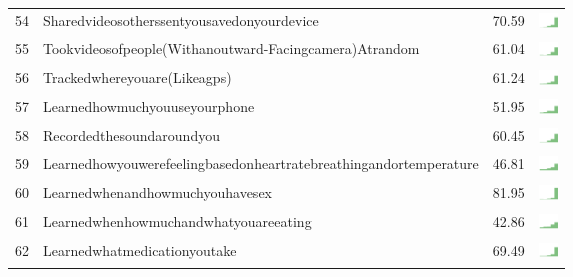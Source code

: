 \begin{table}[t]
\begin{center}
\begin{tabular}{| p{0.5cm} | p{7cm} | p{1cm} | c |}
54 & Sharedvideosotherssentyousavedonyourdevice & 70.59 & \includegraphics[width = 0.5cm, height = 0.5cm]{../sharedvideosotherssentyousavedonyourdevicecombined} \\ 
55 & Tookvideosofpeople(Withanoutward-Facingcamera)Atrandom & 61.04 & \includegraphics[width = 0.5cm, height = 0.5cm]{../tookvideosofpeople(withanoutward-facingcamera)atrandomcombined} \\ 
56 & Trackedwhereyouare(Likeagps) & 61.24 & \includegraphics[width = 0.5cm, height = 0.5cm]{../trackedwhereyouare(likeaGPS)combined} \\ 
57 & Learnedhowmuchyouuseyourphone & 51.95 & \includegraphics[width = 0.5cm, height = 0.5cm]{../learnedhowmuchyouuseyourphonecombined} \\ 
58 & Recordedthesoundaroundyou & 60.45 & \includegraphics[width = 0.5cm, height = 0.5cm]{../recordedthesoundaroundyoucombined} \\ 
59 & Learnedhowyouwerefeelingbasedonheartratebreathingandortemperature & 46.81 & \includegraphics[width = 0.5cm, height = 0.5cm]{../learnedhowyouwerefeelingbasedonheartratebreathingandortemperaturecombined} \\ 
60 & Learnedwhenandhowmuchyouhavesex & 81.95 & \includegraphics[width = 0.5cm, height = 0.5cm]{../learnedwhenandhowmuchyouhavesexcombined} \\ 
61 & Learnedwhenhowmuchandwhatyouareeating & 42.86 & \includegraphics[width = 0.5cm, height = 0.5cm]{../learnedwhenhowmuchandwhatyouareeatingcombined} \\ 
62 & Learnedwhatmedicationyoutake & 69.49 & \includegraphics[width = 0.5cm, height = 0.5cm]{../learnedwhatmedicationyoutakecombined} \\ 

\end{tabular}
\end{center}
\end{table}
